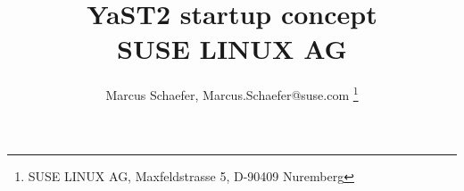 \documentclass[12pt, english, a4paper, headsepline, footsepline,
BCOR1.5cm, DIV16, bigheadings, bibtotoc, idxtotoc, headinclude,
footexclude, abstracton]{scrbook}
\title{
  YaST2 startup concept\\
  SUSE LINUX AG
}
\author{
  Marcus Schaefer, Marcus.Schaefer@suse.com
  \thanks{
  SUSE LINUX AG, Maxfeldstrasse 5, D-90409 Nuremberg
  }
}
\date{
 \vspace{1cm}
 \epsfig{
   file=pictures/logo.ps, width=5cm
 }\\
 \vspace{1.5cm}
 \vspace{2.8cm}
 \begin{tabbing}
  \hspace{2.6cm} Author: \quad\= Marcus Schaefer\\
  \hspace{2.6cm} Date:\>  \today\\
 \end{tabbing}
}
\begin{document}
\dominitoc

\newenvironment{Command}%
 {\begin{Sbox}\begin{large}\begin{minipage}}%
 {\end{minipage}\end{large}\end{Sbox}%
  \vspace{0.5cm}\shadowbox{\TheSbox}\vspace{0.5cm}}

\maketitle
\tableofcontents






\end{document}
